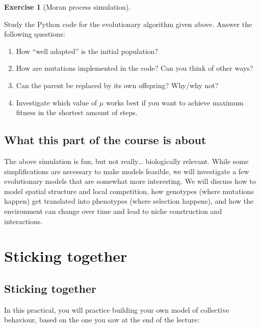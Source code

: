 \documentclass[
  letterpaper,
  DIV=11,
  numbers=noendperiod]{scrreprt}
\providecommand{\tightlist}{%
  \setlength{\itemsep}{0pt}\setlength{\parskip}{0pt}}\usepackage{longtable,booktabs,array}
\theoremstyle{definition}
\newtheorem{exercise}{Exercise}[chapter]
\theoremstyle{remark}
\begin{document}
\begin{exercise}[Moran process
simulation]\protect\hypertarget{exr-moran}{}\label{exr-moran}

Study the Python code for the evolutionary algorithm given above. Answer
the following questions:

\begin{enumerate}
\def\labelenumi{\alph{enumi}.}
\tightlist
\item
  How ``well adapted'' is the initial population?
\item
  How are mutations implemented in the code? Can you think of other
  ways?
\item
  Can the parent be replaced by its own offspring? Why/why not?
\item
  Investigate which value of \(\mu\) works best if you want to achieve
  maximum fitness in the shortest amount of steps.
\end{enumerate}

\end{exercise}

\section{What this part of the course is
about}\label{what-this-part-of-the-course-is-about}

The above simulation is fun, but not really\ldots{} biologically
relevant. While some simplifications are necessary to make models
feasible, we will investigate a few evolutionary models that are
somewhat more interesting. We will discuss how to model spatial
structure and local competition, how genotypes (where mutations happen)
get translated into phenotypes (where selection happens), and how the
environment can change over time and lead to niche construction and
interactions.

\chapter{Sticking together}\label{sticking-together}

\section*{Sticking together}\label{sticking-together-1}


In this practical, you will practice building your own model of
collective behaviour, based on the one you saw at the end of the
lecture:
\end{document}
